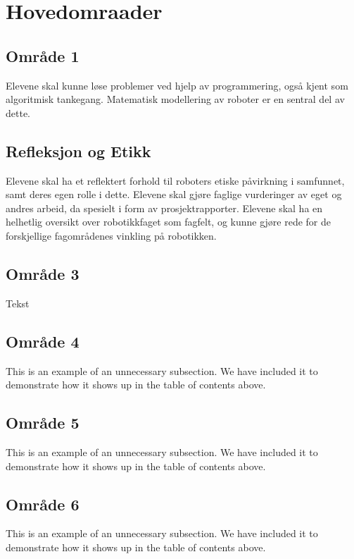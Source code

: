 \section*{Hovedomraader} \label{Sec: Hovedomraader}

\subsection*{Område 1}
    Elevene skal kunne løse problemer ved hjelp av programmering, også kjent som algoritmisk tankegang. Matematisk modellering av roboter er en sentral del av dette.

\subsection*{Refleksjon og Etikk}
    Elevene skal ha et reflektert forhold til roboters etiske påvirkning i samfunnet, samt deres egen rolle i dette.
    Elevene skal gjøre faglige vurderinger av eget og andres arbeid, da spesielt i form av prosjektrapporter.
    Elevene skal ha en helhetlig oversikt over robotikkfaget som fagfelt, og kunne gjøre rede for de forskjellige fagområdenes vinkling på robotikken.

\subsection*{Område 3}
    Tekst

\subsection*{Område 4}
    This is an example of an unnecessary subsection. We have included it to demonstrate how it
    shows up in the table of contents above.

\subsection*{Område 5}
    This is an example of an unnecessary subsection. We have included it to demonstrate how it
    shows up in the table of contents above.

\subsection*{Område 6}
    This is an example of an unnecessary subsection. We have included it to demonstrate how it
    shows up in the table of contents above.
